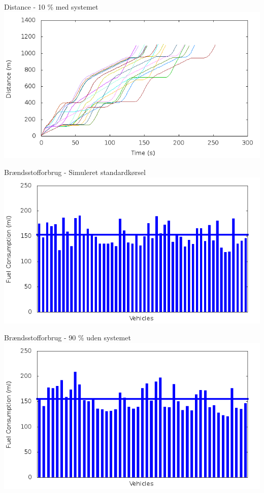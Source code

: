 \begin{frame}{Distance - 10 \% med systemet}
\includegraphics[width=1\textwidth]{images/distanceControlled10.png}
\end{frame}

\begin{frame}{Brændsstofforbrug - Simuleret standardkørsel}
\includegraphics[width=1\textwidth]{images/fuelRouteUncontrolled0.png}
\end{frame}


\begin{frame}{Brændsstofforbrug - 90 \% uden systemet}
\includegraphics[width=1\textwidth]{images/fuelRouteUncontrolled10.png}
\end{frame}

